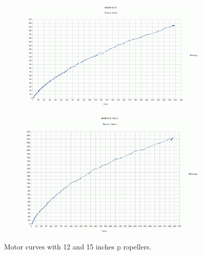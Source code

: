 \begin{figure}[h]
  \centering
  \begin{subfigure}{.8\textwidth}
    \centering
    \includegraphics[width=\linewidth]{figs/curve12.png}
  
  \end{subfigure}%
  
  \begin{subfigure}{.8\textwidth}
    \centering
    \includegraphics[width=\linewidth]{figs/curve15.png}

  \end{subfigure}
  \caption{Motor curves with 12 and 15 inches p
  ropellers.}
  \label{fig:motorcurves}
\end{figure}

